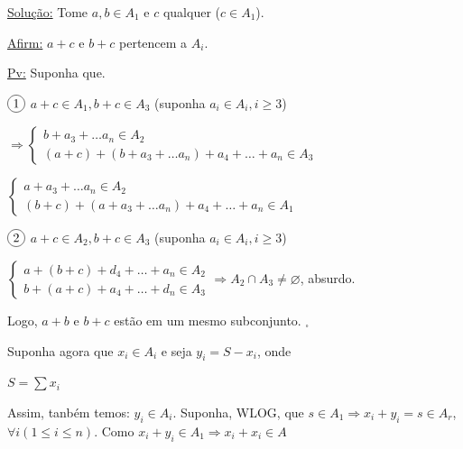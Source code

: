 \documentclass[a4paper,12pt]{article}
\renewcommand{\leq}{\ensuremath{\leqslant}}
\renewcommand{\geq}{\ensuremath{\geqslant}}
\theoremstyle{plain} %
\theoremstyle{definition} %
\theoremstyle{remark} %
\newcommand*\circled[1]{\tikz[baseline=(char.base)]{
		\node[shape=circle,draw,inner sep=2pt] (char) {#1};}}%
\begin{document}
	\begin{framed}
		\underline{Solu\c{c}\~ao:} Tome $a,b\in A_1$ e $c$ qualquer ($c\in A_1$).
		
		\underline{Afirm:} $a+c$ e $b+c$ pertencem a $A_i$.
		
		\underline{Pv:} Suponha que.
		
		$\circled{1}$ \hspace{1em} $a+c \in A_{1}, b+c \in A_{3}$ (suponha $a_i\in A_i, i\geq 3$)
		
		$\Rightarrow \left\{\begin{array}{l} b+a_{3}+\dotso a_{n} \in A_{2} \\ (a+c)+\left(b+a_{3}+\dotso a_{n}\right)+a_{4}+\dotso+a_{n} \in A_{3}\end{array}\right.$
		
		\vspace{1em}
		\hspace{1.5em}$\left\{\begin{array}{l} a+a_{3}+\dotso a_{n} \in A_{2} \\ (b+c)+\left(a+a_{3}+\dotso a_{n}\right)+a_{4}+\dotso+a_{n} \in A_{1}\end{array}\right.$
		
		\vspace{1em}
		$\circled{2}$ \hspace{1em} $a+c \in A_{2}, b+c \in A_{3}$ (suponha $a_i\in A_i, i\geq 3$)
		
		\vspace{1em}
		\hspace{1.5em}$\left\{\begin{array}{l}a+(b+c)+d_{4}+\ldots+a_{n} \in A_{2} \\ b+(a+c)+a_{4}+\ldots+d_{n} \in A_{3}\end{array} \Rightarrow A_{2} \cap A_{3} \neq \varnothing\right.$, absurdo.
		
		\vspace{1em}
		Logo, $a+b$ e $b+c$ est\~ao em um mesmo subconjunto. $_\square$
		
		Suponha agora que $x_i\in A_i$ e seja $y_i=S-x_i$, onde
		
		\begin{center}
			$S=\sum x_i$
		\end{center}
		
		Assim, tanb\'em temos: $y_i\in A_i$. Suponha, WLOG, que $s\in A_1\Rightarrow x_i+y_i=s \in A_r$, $\forall i(1\leq i\leq n)$. Como $x_i+y_i \in A_1\Rightarrow x_i+x_i\in A$ 
		

\end{framed}
\end{document}
